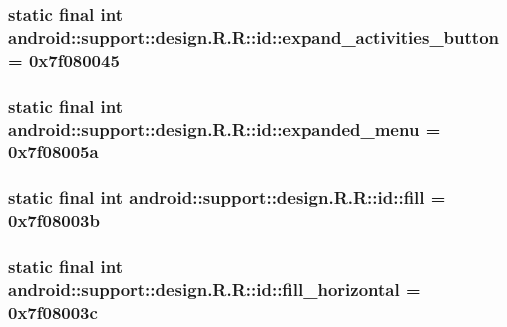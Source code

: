 \hypertarget{classandroid_1_1support_1_1design_1_1_r_1_1id_e79d4e09e85621d534d4720b70dafe1b}{
\subsubsection[{expand\_\-activities\_\-button}]{\setlength{\rightskip}{0pt plus 5cm}static final int android::support::design.R.R::id::expand\_\-activities\_\-button = 0x7f080045}}
\label{classandroid_1_1support_1_1design_1_1_r_1_1id_e79d4e09e85621d534d4720b70dafe1b}


\hypertarget{classandroid_1_1support_1_1design_1_1_r_1_1id_f3dcc22bb6d9de4e8eebe2c452785020}{
\subsubsection[{expanded\_\-menu}]{\setlength{\rightskip}{0pt plus 5cm}static final int android::support::design.R.R::id::expanded\_\-menu = 0x7f08005a}}
\label{classandroid_1_1support_1_1design_1_1_r_1_1id_f3dcc22bb6d9de4e8eebe2c452785020}


\hypertarget{classandroid_1_1support_1_1design_1_1_r_1_1id_106b0148c32946090a6e85c5698a351b}{
\subsubsection[{fill}]{\setlength{\rightskip}{0pt plus 5cm}static final int android::support::design.R.R::id::fill = 0x7f08003b}}
\label{classandroid_1_1support_1_1design_1_1_r_1_1id_106b0148c32946090a6e85c5698a351b}


\hypertarget{classandroid_1_1support_1_1design_1_1_r_1_1id_1a18eb3c786e6d83236ff42221937164}{
\subsubsection[{fill\_\-horizontal}]{\setlength{\rightskip}{0pt plus 5cm}static final int android::support::design.R.R::id::fill\_\-horizontal = 0x7f08003c}}
\label{classandroid_1_1support_1_1design_1_1_r_1_1id_1a18eb3c786e6d83236ff42221937164}


